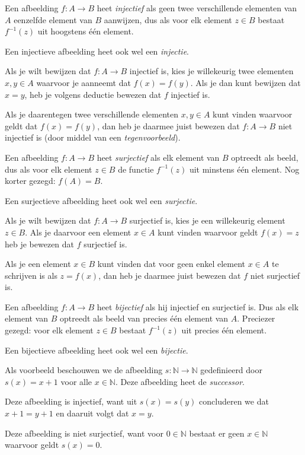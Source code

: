 Een afbeelding $f:A\rightarrow B$ heet \textit{injectief} als geen twee verschillende elementen van $A$ eenzelfde element van $B$ aanwijzen, dus als voor elk element $z\in B$ bestaat $f^{-1}(z)$ uit hoogstens \'e\'en element.

Een injectieve afbeelding heet ook wel een \textit{injectie}.

Als je wilt bewijzen dat $f:A\rightarrow B$ injectief is, kies je willekeurig twee elementen $x,y \in A$ waarvoor je aanneemt dat $f(x)=f(y)$. Als je dan kunt bewijzen dat $x=y$, heb je volgens deductie bewezen dat $f$ injectief is.

Als je daarentegen twee verschillende elementen $x,y\in A$ kunt vinden waarvoor geldt dat $f(x)=f(y)$, dan heb je daarmee juist bewezen dat $f:A\rightarrow B$ niet injectief is (door middel van een \textit{tegenvoorbeeld}).

Een afbeelding $f:A\rightarrow B$ heet \textit{surjectief} als elk element van $B$ optreedt als beeld, dus als voor elk element $z\in B$ de functie $f^{-1}(z)$ uit minstens \'e\'en element. Nog korter gezegd: $f(A)=B$.

Een surjectieve afbeelding heet ook wel een \textit{surjectie}.

Als je wilt bewijzen dat $f:A\rightarrow B$ surjectief is, kies je een willekeurig element $z\in B$. Als je daarvoor een element $x\in A$ kunt vinden waarvoor geldt $f(x)=z$ heb je bewezen dat $f$ surjectief is.

Als je een element $x\in B$ kunt vinden dat voor geen enkel element $x\in A$ te schrijven is als $z=f(x)$, dan heb je daarmee juist bewezen dat $f$ niet surjectief is.

Een afbeelding $f:A\rightarrow B$ heet \textit{bijectief} als hij injectief en surjectief is. Dus als elk element van $B$ optreedt als beeld van precies \'e\'en element van $A$. Preciezer gezegd: voor elk element $z\in B$ bestaat $f^{-1}(z)$ uit precies \'e\'en element.

Een bijectieve afbeelding heet ook wel een \textit{bijectie}.

Als voorbeeld beschouwen we de afbeelding $s:\mathbb{N}\rightarrow\mathbb{N}$ gedefinieerd door $s(x)=x+1$ voor alle $x\in\mathbb{N}$. Deze afbeelding heet de \textit{successor}.

Deze afbeelding is injectief, want uit $s(x)=s(y)$ concluderen we dat $x+1=y+1$ en daaruit volgt dat $x=y$.

Deze afbeelding is niet surjectief, want voor $0\in\mathbb{N}$ bestaat er geen $x\in\mathbb{N}$ waarvoor geldt $s(x)=0$.

